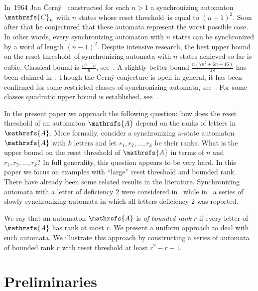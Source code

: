 \documentclass[11pt]{llncs}
\newcommand{\rl}{reset threshold}
\newcommand{\A}{\mathrsfs{A}}
\begin{document}
In~1964 Jan \v{C}ern\'{y}~\cite{Ce64} constructed for each $n>1$ a synchronizing automaton $\mathrsfs{C}_n$ with $n$ states whose \rl\ is
equal to $(n-1)^2$. Soon after that he conjectured that these automata represent the worst possible case. In other words, every
synchronizing automaton with $n$ states can be synchronized by a word of length $(n-1)^2$. Despite intensive research, the best upper bound
on the \rl\ of synchronizing automata with $n$ states achieved so far is cubic. Classical bound is $\frac{n^3-n}6$, see~\cite{Pi83}. A
slightly better bound $\frac{n(7n^2+6n-16)}{48}$ has been claimed in \cite{Tr11}. Though the \v{C}ern\'{y} conjecture is open in general,
it has been confirmed for some restricted classes of synchronizing automata, see~\cite{AS09,Du98,Ka03,Tr07,Vo09}. For some classes
quadratic upper bound is established, see~\cite{BBP,Rys}.

In the present paper we approach the following question: how does the reset threshold of an automaton $\A$ depend on the ranks of letters
in $\A$. More formally, consider a synchronizing $n$-state automaton $\A$ with $k$ letters and let $r_1, r_2, \ldots, r_k$ be their ranks.
What is the upper bound on the reset threshold of $\A$ in terms of $n$ and $r_1, r_2, \ldots, r_k$? In full generality, this question
appears to be very hard. In this paper we focus on examples with ``large'' reset threshold and bounded rank. There have already been some
related results in the literature. Synchronizing automata with a letter of deficiency 2 were considered in~\cite{AVZ} while in~\cite{AGV} a
series of slowly synchronizing automata in which all letters deficiency 2 was reported.

We say that an automaton $\A$ is \emph{of bounded rank} $r$ if every letter of $\A$ has rank at most $r$. We present a uniform approach to
deal with such automata. We illustrate this approach by constructing a series of automata of bounded rank $r$ with reset threshold at least
$r^2 -r - 1$.

\section{Preliminaries}
\end{document}
